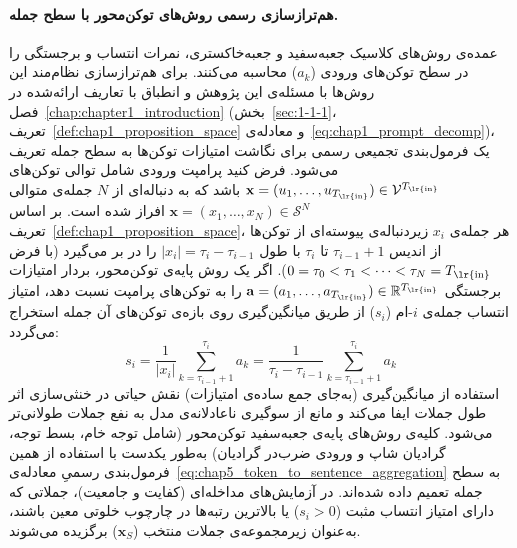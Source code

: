 \paragraph{هم‌ترازسازی رسمی روش‌های توکن‌محور با سطح جمله.}
عمده‌ی روش‌های کلاسیک جعبه‌سفید و جعبه‌خاکستری، نمرات انتساب و برجستگی را در سطح توکن‌های ورودی ($a_k$) محاسبه می‌کنند. برای هم‌ترازسازی نظام‌مند این روش‌ها با مسئله‌ی این پژوهش و انطباق با تعاریف ارائه‌شده در فصل~\ref{chap:chapter1_introduction} (بخش~\ref{sec:1-1-1}، تعریف~\ref{def:chap1_proposition_space} و معادله‌ی~\ref{eq:chap1_prompt_decomp})، یک فرمول‌بندی تجمیعی رسمی برای نگاشت امتیازات توکن‌ها به سطح جمله تعریف می‌شود. فرض کنید پرامپت ورودی شامل توالی توکن‌های $\mathbf{x} = (u_1, \ldots, u_{T_{\text{\lr{in}}}}) \in \mathcal{V}^{T_{\text{\lr{in}}}}$ باشد که به دنباله‌ای از $N$ جمله‌ی متوالی $\mathbf{x} = (x_1, \ldots, x_N) \in \mathcal{S}^N$ افراز شده است. بر اساس تعریف~\ref{def:chap1_proposition_space}، هر جمله‌ی $x_i$ زیردنباله‌ی پیوسته‌ای از توکن‌ها از اندیس $\tau_{i-1}+1$ تا $\tau_i$ با طول $|x_i| = \tau_i - \tau_{i-1}$ را در بر می‌گیرد (با فرض $0 = \tau_0 < \tau_1 < \cdots < \tau_N = T_{\text{\lr{in}}}$). اگر یک روش پایه‌ی توکن‌محور، بردار امتیازات برجستگی $\mathbf{a} = (a_1, \ldots, a_{T_{\text{\lr{in}}}}) \in \mathbb{R}^{T_{\text{\lr{in}}}}$ را به توکن‌های پرامپت نسبت دهد، امتیاز انتساب جمله‌ی $i$-ام ($s_i$) از طریق میانگین‌گیری روی بازه‌ی توکن‌های آن جمله استخراج می‌گردد:
\begin{equation}\label{eq:chap5_token_to_sentence_aggregation}
    s_i = \frac{1}{|x_i|} \sum_{k=\tau_{i-1}+1}^{\tau_i} a_k = \frac{1}{\tau_i - \tau_{i-1}} \sum_{k=\tau_{i-1}+1}^{\tau_i} a_k
\end{equation}
استفاده از میانگین‌گیری (به‌جای جمع ساده‌ی امتیازات) نقش حیاتی در خنثی‌سازی اثر طول جملات ایفا می‌کند و مانع از سوگیری ناعادلانه‌ی مدل به نفع جملات طولانی‌تر می‌شود. کلیه‌ی روش‌های پایه‌ی جعبه‌سفید توکن‌محور (شامل توجه خام، بسط توجه، گرادیان شاپ و ورودی ضرب‌در گرادیان) به‌طور یکدست با استفاده از همین فرمول‌بندی رسمیِ معادله‌ی~\ref{eq:chap5_token_to_sentence_aggregation} به سطح جمله تعمیم داده شده‌اند. در آزمایش‌های مداخله‌ای (کفایت و جامعیت)، جملاتی که دارای امتیاز انتساب مثبت ($s_i > 0$) یا بالاترین رتبه‌ها در چارچوب خلوتی معین باشند، به‌عنوان زیرمجموعه‌ی جملات منتخب ($\mathbf{x}_S$) برگزیده می‌شوند.

